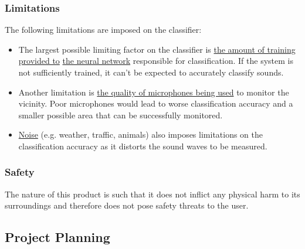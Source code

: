 \documentclass[a4paper,12pt]{article}
\numberwithin{equation}{section}
\numberwithin{figure}{section}
\numberwithin{table}{section}
\begin{document}
\subsubsection{Limitations}
The following limitations are imposed on the classifier:
\begin{itemize}
    \item The largest possible limiting factor on the classifier is \underline{the amount of training provided to} \underline{the neural network} responsible for classification. If the system is not sufficiently trained, it can't be expected to accurately classify sounds.
    \item Another limitation is \underline{the quality of microphones being used} to monitor the vicinity. Poor microphones would lead to worse classification accuracy and a smaller possible area that can be successfully monitored.
    \item \underline{Noise} (e.g. weather, traffic, animals) also imposes limitations on the classification accuracy as it distorts the sound waves to be measured.
\end{itemize}



\subsubsection{Safety}
The nature of this product is such that it does not inflict any physical harm to its surroundings and therefore does not pose safety threats to the user.



\subsection{Project Planning}
\end{document}

